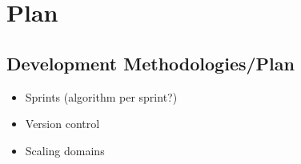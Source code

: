 \chapter{Plan}
\label{chapter3}

\section{Development Methodologies/Plan}
\begin{itemize}
    \item Sprints (algorithm per sprint?)
    \item Version control
    \item Scaling domains
\end{itemize}